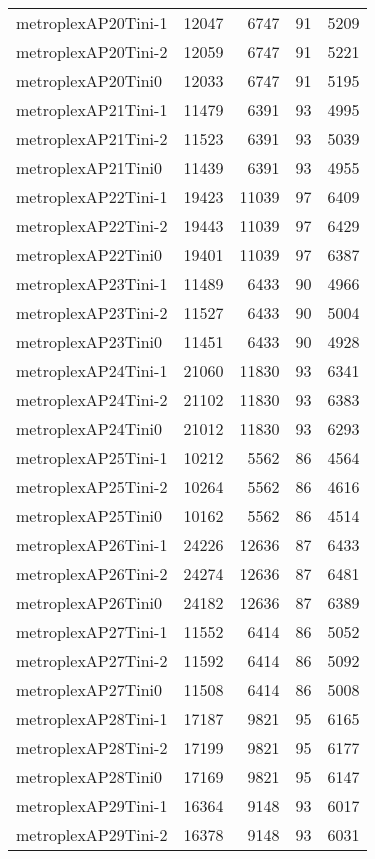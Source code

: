 \documentclass[../../../thesis.tex]{subfiles}
\begin{document}
\begin{longtable}{lrrrr}
metroplexAP20Tini-1 & 12047 & 6747 & 91 & 5209 \\
metroplexAP20Tini-2 & 12059 & 6747 & 91 & 5221 \\
metroplexAP20Tini0 & 12033 & 6747 & 91 & 5195 \\
metroplexAP21Tini-1 & 11479 & 6391 & 93 & 4995 \\
metroplexAP21Tini-2 & 11523 & 6391 & 93 & 5039 \\
metroplexAP21Tini0 & 11439 & 6391 & 93 & 4955 \\
metroplexAP22Tini-1 & 19423 & 11039 & 97 & 6409 \\
metroplexAP22Tini-2 & 19443 & 11039 & 97 & 6429 \\
metroplexAP22Tini0 & 19401 & 11039 & 97 & 6387 \\
metroplexAP23Tini-1 & 11489 & 6433 & 90 & 4966 \\
metroplexAP23Tini-2 & 11527 & 6433 & 90 & 5004 \\
metroplexAP23Tini0 & 11451 & 6433 & 90 & 4928 \\
metroplexAP24Tini-1 & 21060 & 11830 & 93 & 6341 \\
metroplexAP24Tini-2 & 21102 & 11830 & 93 & 6383 \\
metroplexAP24Tini0 & 21012 & 11830 & 93 & 6293 \\
metroplexAP25Tini-1 & 10212 & 5562 & 86 & 4564 \\
metroplexAP25Tini-2 & 10264 & 5562 & 86 & 4616 \\
metroplexAP25Tini0 & 10162 & 5562 & 86 & 4514 \\
metroplexAP26Tini-1 & 24226 & 12636 & 87 & 6433 \\
metroplexAP26Tini-2 & 24274 & 12636 & 87 & 6481 \\
metroplexAP26Tini0 & 24182 & 12636 & 87 & 6389 \\
metroplexAP27Tini-1 & 11552 & 6414 & 86 & 5052 \\
metroplexAP27Tini-2 & 11592 & 6414 & 86 & 5092 \\
metroplexAP27Tini0 & 11508 & 6414 & 86 & 5008 \\
metroplexAP28Tini-1 & 17187 & 9821 & 95 & 6165 \\
metroplexAP28Tini-2 & 17199 & 9821 & 95 & 6177 \\
metroplexAP28Tini0 & 17169 & 9821 & 95 & 6147 \\
metroplexAP29Tini-1 & 16364 & 9148 & 93 & 6017 \\
metroplexAP29Tini-2 & 16378 & 9148 & 93 & 6031 \\

\end{longtable}
\end{document}
